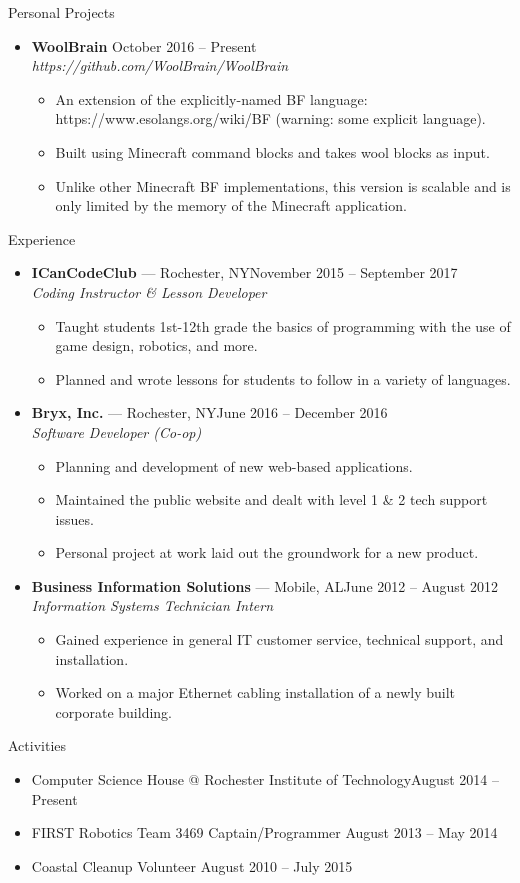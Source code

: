 \documentclass[10pt,oneside]{article}
\newenvironment{ressection}[1]{
	\vspace{3pt}
	{\fontfamily{bch}\selectfont\Large#1}
	\begin{itemize}
	\vspace{2pt}
}{
	\end{itemize}
}
\newcommand{\resitem}[1]{
	\vspace{-2pt}
	\item \begin{flushleft} #1 \end{flushleft}
}
\newcommand{\ressubitem}[1]{
	\vspace{-1pt}
	\item \begin{flushleft} #1 \end{flushleft}
}
\newcommand{\resbigitem}[3]{
	\vspace{-3pt}
	\item
	\textbf{#1} --- #2 \\
	\textit{#3}
}
\newcommand{\resaltitem}[3]{
	\vspace{-3pt}
	\item
	\textbf{#1} \hfill #2 \\
	\textit{#3}
}
\newenvironment{ressubsec}[3]{
	\resbigitem{#1}{#2}{#3}
	\vspace{-1pt}
	\begin{itemize}
}{
	\end{itemize}
}
\newenvironment{resaltsec}[3]{
	\resaltitem{#1}{#2}{#3}
	\vspace{-1pt}
	\begin{itemize}
}{
	\end{itemize}
}
\begin{document}
\begin{ressection}{Personal Projects}

	\begin{resaltsec}{WoolBrain}{October 2016 -- Present}{https://github.com/WoolBrain/WoolBrain}
		\ressubitem{An extension of the explicitly-named BF language: https://www.esolangs.org/wiki/BF (warning: some explicit language).}
		\ressubitem{Built using Minecraft command blocks and takes wool blocks as input.}
		\ressubitem{Unlike other Minecraft BF implementations, this version is scalable and is only limited by the memory of the Minecraft application.}
	\end{resaltsec}
\end{ressection}


\begin{ressection}{Experience}

	\begin{ressubsec}{ICanCodeClub}{Rochester, NY\hfill November 2015 -- September 2017}{Coding Instructor \& Lesson Developer}
		\ressubitem{Taught students 1st-12th grade the basics of programming with the use of game design, robotics, and more.}
		\ressubitem{Planned and wrote lessons for students to follow in a variety of languages.}
	\end{ressubsec}
	\begin{ressubsec}{Bryx, Inc.}{Rochester, NY\hfill June 2016 -- December 2016}{Software Developer (Co-op)}
		\ressubitem{Planning and development of new web-based applications.}
		\ressubitem{Maintained the public website and dealt with level 1 \& 2 tech support issues.}
		\ressubitem{Personal project at work laid out the groundwork for a new product.}
	\end{ressubsec}
	\begin{ressubsec}{Business Information Solutions}{Mobile, AL\hfill June 2012 -- August 2012}{Information Systems Technician Intern}
		\ressubitem{Gained experience in general IT customer service, technical support, and installation.}
		\ressubitem{Worked on a major Ethernet cabling installation of a newly built corporate building.}
	\end{ressubsec}

\end{ressection}


\begin{ressection}{Activities}

	\resitem{Computer Science House @ Rochester Institute of Technology\hfill August 2014 -- Present}
	\resitem{FIRST Robotics Team 3469 Captain/Programmer \hfill August 2013 -- May 2014}
	\resitem{Coastal Cleanup Volunteer \hfill August 2010 -- July 2015}

\end{ressection}
\end{document}
